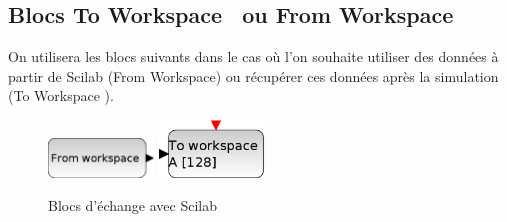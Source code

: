 \subsection{Blocs \og To Workspace \fg~ou \og From Workspace\fg}

On utilisera les blocs suivants dans le cas où l'on souhaite 
utiliser des données à partir de Scilab (\og From Workspace\fg) 
ou récupérer ces données après la simulation (\og To Workspace \fg).

\begin{figure}[!h]
    \centering
    \includegraphics[width=0.25\textwidth]{fig/FROMWSB.eps}\hspace{3cm}
    \includegraphics[width=0.25\textwidth]{fig/TOWS_c.eps}
    \caption{Blocs d'échange avec Scilab\label{fig-workspace}}
\end{figure}



